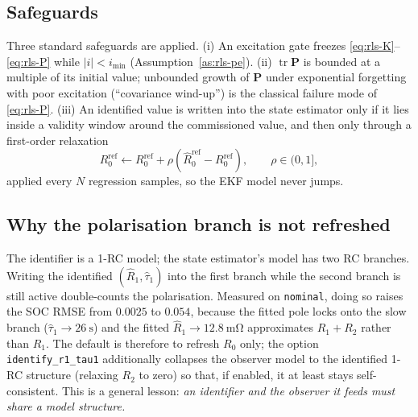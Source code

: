 \subsection{Safeguards}
Three standard safeguards are applied.  (i) An excitation gate freezes
\eqref{eq:rls-K}--\eqref{eq:rls-P} while $|i|<i_{\min}$ (Assumption~\ref{as:rls-pe}).
(ii) $\operatorname{tr}\mathbf{P}$ is bounded at a multiple of its initial value; unbounded growth
of $\mathbf{P}$ under exponential forgetting with poor excitation (``covariance wind-up'') is the
classical failure mode of \eqref{eq:rls-P}.  (iii) An identified value is written into the state
estimator only if it lies inside a validity window around the commissioned value, and then only
through a first-order relaxation
\begin{equation}
R_0^{\text{ref}}\leftarrow R_0^{\text{ref}}+\rho\left(\hat{R}_0^{\text{ref}}-R_0^{\text{ref}}\right),
\qquad \rho\in(0,1],
\label{eq:rls-relax}
\end{equation}
applied every $N$ regression samples, so the EKF model never jumps.

\subsection{Why the polarisation branch is not refreshed}
\label{sec:rls-struct}
The identifier is a 1-RC model; the state estimator's model has two RC branches.  Writing the
identified $(\hat R_1,\hat\tau_1)$ into the first branch while the second branch is still active
double-counts the polarisation.  Measured on \texttt{nominal}, doing so raises the SOC RMSE from
$0.0025$ to $0.054$, because the fitted pole locks onto the slow branch
($\hat\tau_1\to\SI{26}{\second}$) and the fitted $\hat R_1\to\SI{12.8}{\milli\ohm}$ approximates
$R_1+R_2$ rather than $R_1$.  The default is therefore to refresh $R_0$ only; the option
\texttt{identify\_r1\_tau1} additionally collapses the observer model to the identified 1-RC
structure (relaxing $R_2$ to zero) so that, if enabled, it at least stays self-consistent.  This is
a general lesson: \emph{an identifier and the observer it feeds must share a model structure.}

